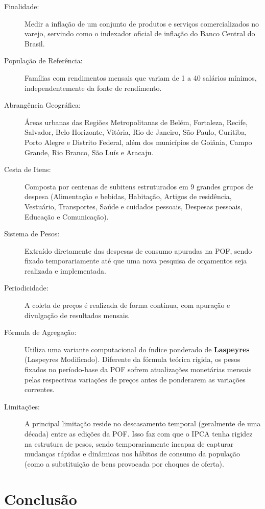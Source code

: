 \documentclass[12pt,a4paper]{article}
\begin{document}
\begin{description}
    \item[Finalidade:] Medir a inflação de um conjunto de produtos e serviços comercializados no varejo, servindo como o indexador oficial de inflação do Banco Central do Brasil.
    \item[População de Referência:] Famílias com rendimentos mensais que variam de 1 a 40 salários mínimos, independentemente da fonte de rendimento.
    \item[Abrangência Geográfica:] Áreas urbanas das Regiões Metropolitanas de Belém, Fortaleza, Recife, Salvador, Belo Horizonte, Vitória, Rio de Janeiro, São Paulo, Curitiba, Porto Alegre e Distrito Federal, além dos municípios de Goiânia, Campo Grande, Rio Branco, São Luís e Aracaju.
    \item[Cesta de Itens:] Composta por centenas de subitens estruturados em 9 grandes grupos de despesa (Alimentação e bebidas, Habitação, Artigos de residência, Vestuário, Transportes, Saúde e cuidados pessoais, Despesas pessoais, Educação e Comunicação).
    \item[Sistema de Pesos:] Extraído diretamente das despesas de consumo apuradas na POF, sendo fixado temporariamente até que uma nova pesquisa de orçamentos seja realizada e implementada.
    \item[Periodicidade:] A coleta de preços é realizada de forma contínua, com apuração e divulgação de resultados mensais.
    \item[Fórmula de Agregação:] Utiliza uma variante computacional do índice ponderado de \textbf{Laspeyres} (Laspeyres Modificado). Diferente da fórmula teórica rígida, os pesos fixados no período-base da POF sofrem atualizações monetárias mensais pelas respectivas variações de preços antes de ponderarem as variações correntes.
    \item[Limitações:] A principal limitação reside no descasamento temporal (geralmente de uma década) entre as edições da POF. Isso faz com que o IPCA tenha rigidez na estrutura de pesos, sendo temporariamente incapaz de capturar mudanças rápidas e dinâmicas nos hábitos de consumo da população (como a substituição de bens provocada por choques de oferta).
\end{description}

\section{Conclusão}
\label{sec:conclusao}
\end{document}
